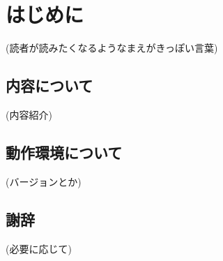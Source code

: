 \chapter{はじめに}
\label{chap:preface}

(読者が読みたくなるようなまえがきっぽい言葉)

\section*{内容について}
\label{sec:-1}

(内容紹介)

\section*{動作環境について}
\label{sec:-2}

(バージョンとか)

\section*{謝辞}
\label{sec:-3}

(必要に応じて)
